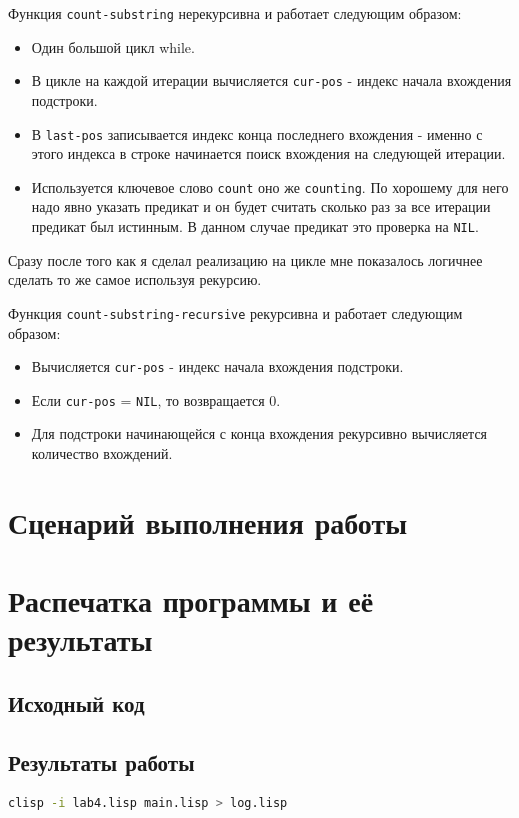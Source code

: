 \documentclass[12pt]{article}
\begin{document}
Функция {\tt count-substring} нерекурсивна и работает следующим образом:
\begin{itemize}
\setlength{\itemsep}{-1mm} %
\item Один большой цикл while.
\item В цикле на каждой итерации вычисляется {\tt cur-pos} - индекс начала вхождения подстроки.
\item В {\tt last-pos} записывается индекс конца последнего вхождения - именно с этого индекса
  в строке начинается поиск вхождения на следующей итерации.
\item Используется ключевое слово {\tt count} оно же {\tt counting}.
  По хорошему для него надо явно указать предикат и он будет считать сколько раз за все итерации
  предикат был истинным. В данном случае предикат это проверка на {\tt NIL}.
\end{itemize}

Сразу после того как я сделал реализацию на цикле мне показалось логичнее сделать то же самое используя рекурсию.

Функция {\tt count-substring-recursive} рекурсивна и работает следующим образом:
\begin{itemize}
\setlength{\itemsep}{-1mm} %
\item Вычисляется {\tt cur-pos} - индекс начала вхождения подстроки.
\item Если {\tt cur-pos} = {\tt NIL}, то возвращается 0.
\item Для подстроки начинающейся с конца вхождения рекурсивно вычисляется количество вхождений.
\end{itemize}
\section{Сценарий выполнения работы}
\section{Распечатка программы и её результаты}

\subsection{Исходный код}

\subsection{Результаты работы}
\lstinline[language=sh]{clisp -i lab4.lisp main.lisp > log.lisp}
\end{document}
